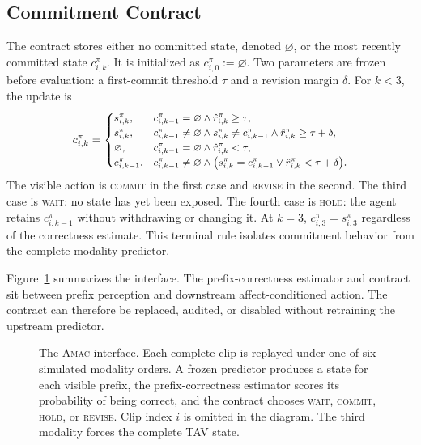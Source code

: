 \documentclass[journal]{IEEEtran}
\newcommand{\method}{\textsc{Amac}}
\begin{document}
\subsection{Commitment Contract}

The contract stores either no committed state, denoted $\varnothing$, or the most recently committed state $c_{i,k}^{\pi}$. It is initialized as $c_{i,0}^{\pi}:=\varnothing$. Two parameters are frozen before evaluation: a first-commit threshold $\tau$ and a revision margin $\delta$. For $k<3$, the update is
\begin{equation}
\small
c_{i,k}^{\pi}=
\begin{cases}
s_{i,k}^{\pi}, & c_{i,k-1}^{\pi}=\varnothing \land \hat r_{i,k}^{\pi}\geq\tau,\\
s_{i,k}^{\pi}, & c_{i,k-1}^{\pi}\neq\varnothing \land s_{i,k}^{\pi}\neq c_{i,k-1}^{\pi}
       \land \hat r_{i,k}^{\pi}\geq\tau+\delta,\\
\varnothing, & c_{i,k-1}^{\pi}=\varnothing \land \hat r_{i,k}^{\pi}<\tau,\\
c_{i,k-1}^{\pi}, & c_{i,k-1}^{\pi}\neq\varnothing \land
       \bigl(s_{i,k}^{\pi}=c_{i,k-1}^{\pi}\lor \hat r_{i,k}^{\pi}<\tau+\delta\bigr).
\end{cases}
\label{eq:contract}
\end{equation}
The visible action is \textsc{commit} in the first case and \textsc{revise} in the second. The third case is \textsc{wait}: no state has yet been exposed. The fourth case is \textsc{hold}: the agent retains $c_{i,k-1}^{\pi}$ without withdrawing or changing it. At $k=3$, $c_{i,3}^{\pi}=s_{i,3}^{\pi}$ regardless of the correctness estimate. This terminal rule isolates commitment behavior from the complete-modality predictor.

Figure~\ref{fig:overview} summarizes the interface. The prefix-correctness estimator and contract sit between prefix perception and downstream affect-conditioned action. The contract can therefore be replaced, audited, or disabled without retraining the upstream predictor.

\begin{figure}[t]
\centering
\resizebox{\columnwidth}{!}{}
\caption{The \method{} interface. Each complete clip is replayed under one of six simulated modality orders. A frozen predictor produces a state for each visible prefix, the prefix-correctness estimator scores its probability of being correct, and the contract chooses \textsc{wait}, \textsc{commit}, \textsc{hold}, or \textsc{revise}. Clip index $i$ is omitted in the diagram. The third modality forces the complete TAV state.}
\label{fig:overview}
\end{figure}
\end{document}

